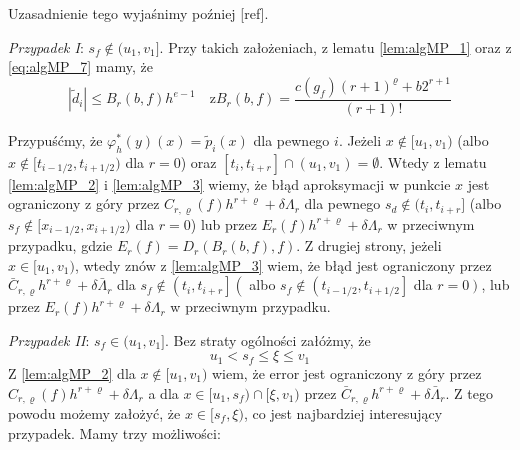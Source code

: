 \documentclass[oik, pdftex, robocza, man]{mgrwms}
\begin{document}
    Uzasadnienie tego wyjaśnimy poźniej [ref].

    \textit{Przypadek I}: $s_{f} \notin (u_{1}, v_{1}]$.
    Przy takich założeniach, z lematu \ref{lem:algMP_1} oraz z \ref{eq:algMP_7} mamy, że
    \begin{equation*}
        |\tilde{d}_{i}| \leq B_{r}(b, f) h^{e-1} \quad \text{z} B_{r}(b, f)=\frac{c\left(g_{f}\right)(r+1)^{\varrho}+b 2^{r+1}}{(r+1) !}
    \end{equation*}

    Przypuśćmy, że $\varphi_{h}^{*}(y)(x) = \tilde{p}_{i}(x)$ dla pewnego $i$. Jeżeli $x \notin [u_{1}, v_{1})$ (albo $x \notin [t_{i-1/2}, t_{i+1/2})$ dla $r=0$) oraz $[t_{i}, t_{i+r}] \cap (u_{1}, v_{1}) = \emptyset$. Wtedy z lematu \ref{lem:algMP_2} i \ref{lem:algMP_3} wiemy, że błąd aproksymacji w punkcie $x$ jest ograniczony z góry przez $C_{r,\varrho}(f)h^{r+\varrho} + \delta \Lambda_{r}$ dla pewnego $s_{d} \notin (t_{i}, t_{i+r}]$ (albo $s_{f} \notin [x_{i-1/2}, x_{i+1/2})$ dla $r=0$) lub przez $E_{r}(f)h^{r+\varrho} + \delta \Lambda_{r}$ w przeciwnym przypadku, gdzie $E_{r}(f) = D_{r}(B_{r}(b, f), f)$.
    Z drugiej strony, jeżeli $x \in [u_{1}, v_{1})$, wtedy znów z \ref{lem:algMP_3} wiem, że błąd jest ograniczony przez $\bar{C}_{r, \varrho} h^{r+\varrho}+\delta \bar{\Lambda}_{r}$ dla $s_{f} \notin \left(t_{i}, t_{i+r}\right]\left(\right.$ albo $s_{f} \notin\left(t_{i-1 / 2}, t_{i+1 / 2}\right]$ dla $\left.r=0\right)$, lub przez $E_{r}(f) h^{r+\varrho}+\delta \Lambda_{r}$ w przeciwnym przypadku.

    \textit{Przypadek II}: $s_{f} \in (u_{1}, v_{1}]$.
    Bez straty ogólności załóżmy, że
    \begin{equation*}
        u_{1} < s_{f} \leq \xi \leq v_{1}
    \end{equation*}
    Z \ref{lem:algMP_2} dla $x \notin [u_{1}, v_{1})$ wiem, że error jest ograniczony z góry przez $C_{r, \varrho}(f) h^{r+\varrho}+\delta \Lambda_{r}$ a dla $x \in [u_{1}, s_{f}) \cap [\xi, v_{1})$ przez $\bar{C}_{r, \varrho} h^{r+\varrho}+\delta \bar{\Lambda}_{r}$. Z tego powodu możemy założyć, że $x \in [s_{f}, \xi)$, co jest najbardziej interesujący przypadek. Mamy trzy możliwości:
\end{document}
